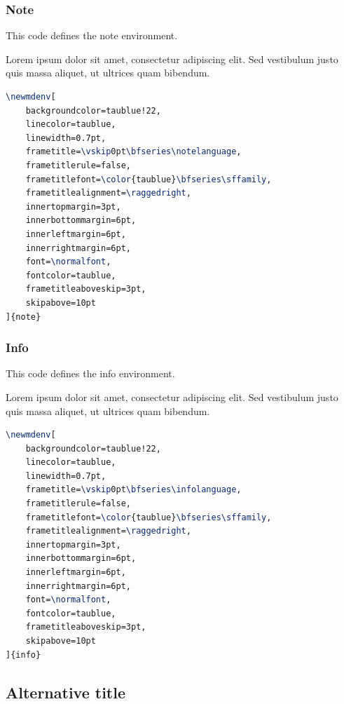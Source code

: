 \documentclass[9pt,a4paper,twoside]{tau}
\begin{document}
		\subsubsection{Note}

                This code defines the note environment.

  			\begin{note}
                    Lorem ipsum dolor sit amet, consectetur adipiscing elit. Sed vestibulum justo quis massa aliquet, ut ultrices quam bibendum.
			\end{note}
		
\begin{lstlisting}[language=TeX, caption=Note environment code.]
\newmdenv[
	backgroundcolor=taublue!22, 						
	linecolor=taublue,									
	linewidth=0.7pt,
	frametitle=\vskip0pt\bfseries\notelanguage,
	frametitlerule=false,
	frametitlefont=\color{taublue}\bfseries\sffamily,
	frametitlealignment=\raggedright,
	innertopmargin=3pt,
	innerbottommargin=6pt,
	innerleftmargin=6pt,
	innerrightmargin=6pt,
	font=\normalfont,
	fontcolor=taublue,									
	frametitleaboveskip=3pt,
	skipabove=10pt
]{note} \end{lstlisting}

		\subsubsection{Info}

                This code defines the info environment.

    		\begin{info}
                    Lorem ipsum dolor sit amet, consectetur adipiscing elit. Sed vestibulum justo quis massa aliquet, ut ultrices quam bibendum.
			\end{info}
		
\begin{lstlisting}[language=TeX, caption=Info environment code.]
\newmdenv[
	backgroundcolor=taublue!22, 						
	linecolor=taublue,									
	linewidth=0.7pt,
	frametitle=\vskip0pt\bfseries\infolanguage,
	frametitlerule=false,
	frametitlefont=\color{taublue}\bfseries\sffamily,
	frametitlealignment=\raggedright,
	innertopmargin=3pt,
	innerbottommargin=6pt,
	innerleftmargin=6pt,
	innerrightmargin=6pt,
	font=\normalfont,
	fontcolor=taublue,									
	frametitleaboveskip=3pt,
	skipabove=10pt
]{info} \end{lstlisting}

    \subsection{Alternative title}
\end{document}
